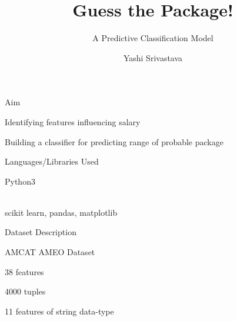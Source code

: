 \documentclass[14pt]{beamer}
\title{Guess the Package!}
\subtitle{A Predictive Classification Model}
\author{Yashi Srivastava}
\institute{TalentSprint WE}
\begin{document}
\begin{frame}[plain]
\maketitle
\end{frame}

\begin{frame}{Aim}
\renewcommand{\labelitemi}{$\square $}
 \begin{fullpageitemize}
  \item Identifying features influencing salary
  \pause
  \item Building a classifier for predicting range of probable package
 \end{fullpageitemize}
\end{frame}
\begin{frame}{Languages/Libraries Used}
\pause
\renewcommand{\labelitemi}{$\square $}
 \begin{fullpageitemize}
  \item Python3 
  \\~\
  \item scikit learn, pandas, matplotlib
 \end{fullpageitemize}
\end{frame}
\begin{frame}{Dataset Description}
\pause
\renewcommand{\labelitemi}{$\square $}
 \begin{fullpageitemize}
  \item AMCAT AMEO Dataset 
  \item 38 features 
  \item 4000 tuples 
  \item 11 features of string data-type
 \end{fullpageitemize}
\end{frame}
\end{document}
